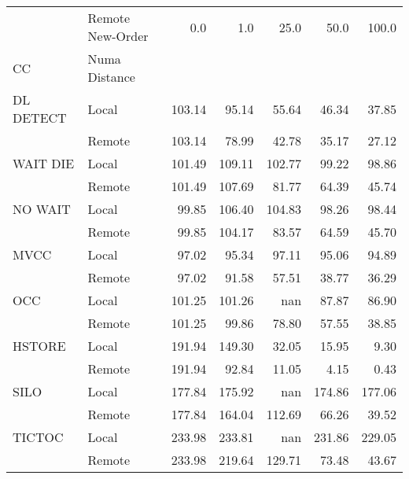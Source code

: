 \begin{tabular}{llrrrrr}
\toprule
       & Remote New-Order &  0.0   &  1.0   &  25.0  &  50.0  &  100.0 \\
CC & Numa Distance &        &        &        &        &        \\
\midrule
DL DETECT & Local & 103.14 &  95.14 &  55.64 &  46.34 &  37.85 \\
       & Remote & 103.14 &  78.99 &  42.78 &  35.17 &  27.12 \\
WAIT DIE & Local & 101.49 & 109.11 & 102.77 &  99.22 &  98.86 \\
       & Remote & 101.49 & 107.69 &  81.77 &  64.39 &  45.74 \\
NO WAIT & Local &  99.85 & 106.40 & 104.83 &  98.26 &  98.44 \\
       & Remote &  99.85 & 104.17 &  83.57 &  64.59 &  45.70 \\
MVCC & Local &  97.02 &  95.34 &  97.11 &  95.06 &  94.89 \\
       & Remote &  97.02 &  91.58 &  57.51 &  38.77 &  36.29 \\
OCC & Local & 101.25 & 101.26 &    nan &  87.87 &  86.90 \\
       & Remote & 101.25 &  99.86 &  78.80 &  57.55 &  38.85 \\
HSTORE & Local & 191.94 & 149.30 &  32.05 &  15.95 &   9.30 \\
       & Remote & 191.94 &  92.84 &  11.05 &   4.15 &   0.43 \\
SILO & Local & 177.84 & 175.92 &    nan & 174.86 & 177.06 \\
       & Remote & 177.84 & 164.04 & 112.69 &  66.26 &  39.52 \\
TICTOC & Local & 233.98 & 233.81 &    nan & 231.86 & 229.05 \\
       & Remote & 233.98 & 219.64 & 129.71 &  73.48 &  43.67 \\
\bottomrule
\end{tabular}
